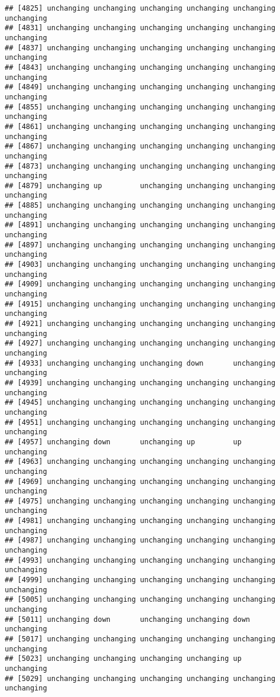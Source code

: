 \documentclass[]{article}
\begin{document}
\begin{verbatim}
## [4825] unchanging unchanging unchanging unchanging unchanging unchanging
## [4831] unchanging unchanging unchanging unchanging unchanging unchanging
## [4837] unchanging unchanging unchanging unchanging unchanging unchanging
## [4843] unchanging unchanging unchanging unchanging unchanging unchanging
## [4849] unchanging unchanging unchanging unchanging unchanging unchanging
## [4855] unchanging unchanging unchanging unchanging unchanging unchanging
## [4861] unchanging unchanging unchanging unchanging unchanging unchanging
## [4867] unchanging unchanging unchanging unchanging unchanging unchanging
## [4873] unchanging unchanging unchanging unchanging unchanging unchanging
## [4879] unchanging up         unchanging unchanging unchanging unchanging
## [4885] unchanging unchanging unchanging unchanging unchanging unchanging
## [4891] unchanging unchanging unchanging unchanging unchanging unchanging
## [4897] unchanging unchanging unchanging unchanging unchanging unchanging
## [4903] unchanging unchanging unchanging unchanging unchanging unchanging
## [4909] unchanging unchanging unchanging unchanging unchanging unchanging
## [4915] unchanging unchanging unchanging unchanging unchanging unchanging
## [4921] unchanging unchanging unchanging unchanging unchanging unchanging
## [4927] unchanging unchanging unchanging unchanging unchanging unchanging
## [4933] unchanging unchanging unchanging down       unchanging unchanging
## [4939] unchanging unchanging unchanging unchanging unchanging unchanging
## [4945] unchanging unchanging unchanging unchanging unchanging unchanging
## [4951] unchanging unchanging unchanging unchanging unchanging unchanging
## [4957] unchanging down       unchanging up         up         unchanging
## [4963] unchanging unchanging unchanging unchanging unchanging unchanging
## [4969] unchanging unchanging unchanging unchanging unchanging unchanging
## [4975] unchanging unchanging unchanging unchanging unchanging unchanging
## [4981] unchanging unchanging unchanging unchanging unchanging unchanging
## [4987] unchanging unchanging unchanging unchanging unchanging unchanging
## [4993] unchanging unchanging unchanging unchanging unchanging unchanging
## [4999] unchanging unchanging unchanging unchanging unchanging unchanging
## [5005] unchanging unchanging unchanging unchanging unchanging unchanging
## [5011] unchanging down       unchanging unchanging down       unchanging
## [5017] unchanging unchanging unchanging unchanging unchanging unchanging
## [5023] unchanging unchanging unchanging unchanging up         unchanging
## [5029] unchanging unchanging unchanging unchanging unchanging unchanging

\end{verbatim}
\end{document}
